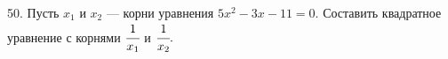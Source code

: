 50. Пусть $x_1$ и $x_2$ --- корни уравнения $5x^2-3x-11=0.$ Составить квадратное уравнение с корнями $\cfrac{1}{x_1}$ и $\cfrac{1}{x_2}.$\\

